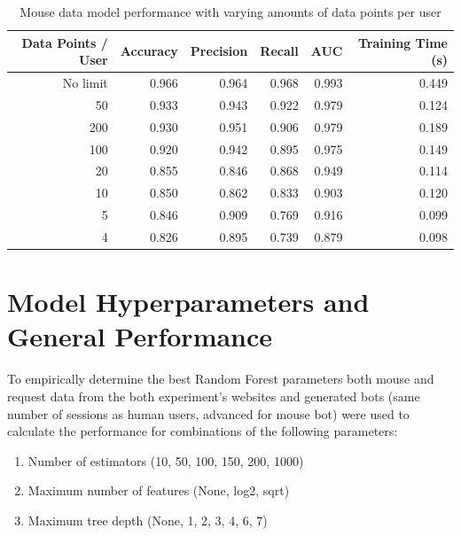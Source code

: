 \documentclass[
    fontsize=12pt,
    headings=small,
    parskip=half,           %
    bibliography=totoc,
    numbers=noenddot,       %
    open=any,               %
    final,                   %
    table
]{scrreprt}
\begin{document}
\begin{table}[H]
    \begin{center}
        \begin{tabular}{rrrrrr}
            \toprule
            Data Points / User & Accuracy & Precision & Recall & AUC & Training Time (s) \\
            \midrule
            No limit & 0.966 & 0.964 & 0.968 & 0.993 & 0.449 \\
            50 & 0.933 & 0.943 & 0.922 & 0.979 & 0.124 \\
            200 & 0.930 & 0.951 & 0.906 & 0.979 & 0.189 \\
            100 & 0.920 & 0.942 & 0.895 & 0.975 & 0.149 \\
            20 & 0.855 & 0.846 & 0.868 & 0.949 & 0.114 \\
            10 & 0.850 & 0.862 & 0.833 & 0.903 & 0.120 \\
            5 & 0.846 & 0.909 & 0.769 & 0.916 & 0.099 \\
            4 & 0.826 & 0.895 & 0.739 & 0.879 & 0.098 \\
            \bottomrule
        \end{tabular}
    \end{center}
    \caption{Mouse data model performance with varying amounts of data points per user}
    \label{table:mouse_params_no_limit}
\end{table}

\section{Model Hyperparameters and General Performance}

To empirically determine the best Random Forest parameters both mouse and request data from the both experiment's websites and generated bots (same number of sessions as human users, advanced for mouse bot) were used to calculate the performance for combinations of the following parameters:

\begin{enumerate}
    \item Number of estimators (10, 50, 100, 150, 200, 1000)
    \item Maximum number of features (None, log2, sqrt)
    \item Maximum tree depth (None, 1, 2, 3, 4, 6, 7)
\end{enumerate}
\end{document}
